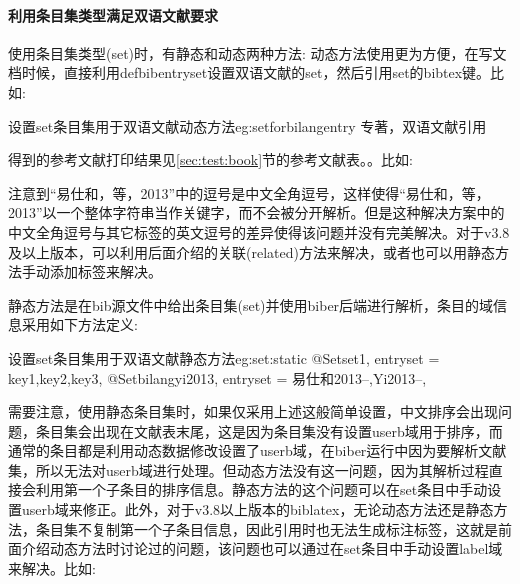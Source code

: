 \paragraph{利用条目集类型满足双语文献要求}

使用条目集类型(set)时，有静态和动态两种方法:
动态方法使用更为方便，在写文档时候，直接利用defbibentryset设置双语文献的set，然后引用set的bibtex键。比如:
\begin{codetex}{设置set条目集用于双语文献动态方法}{eg:setforbilangentry}
专著，双语文献引用\cite{bilangyi2013}
\end{codetex}

得到的参考文献打印结果见\ref{sec:test:book}节的参考文献表。。比如:
注意到“易仕和，等，2013”中的逗号是中文全角逗号，这样使得“易仕和，等，2013”以一个整体字符串当作关键字，而不会被分开解析。但是这种解决方案中的中文全角逗号与其它标签的英文逗号的差异使得该问题并没有完美解决。对于v3.8及以上版本，可以利用后面介绍的关联(related)方法来解决，或者也可以用静态方法手动添加标签来解决。

静态方法是在bib源文件中给出条目集(set)并使用biber后端进行解析，条目的域信息采用如下方法定义:
\begin{codetex}{设置set条目集用于双语文献静态方法}{eg:set:static}
@Set{set1,
entryset = {key1,key2,key3},
}
@Set{bilangyi2013,
entryset = {易仕和2013--,Yi2013--},
}
\end{codetex}

需要注意，使用静态条目集时，如果仅采用上述这般简单设置，中文排序会出现问题，条目集会出现在文献表末尾，这是因为条目集没有设置userb域用于排序，而通常的条目都是利用动态数据修改设置了userb域，在biber运行中因为要解析文献集，所以无法对userb域进行处理。但动态方法没有这一问题，因为其解析过程直接会利用第一个子条目的排序信息。静态方法的这个问题可以在set条目中手动设置userb域来修正。此外，对于v3.8以上版本的biblatex，无论动态方法还是静态方法，条目集不复制第一个子条目信息，因此引用时也无法生成标注标签，这就是前面介绍动态方法时讨论过的问题，该问题也可以通过在set条目中手动设置label域来解决。比如:

